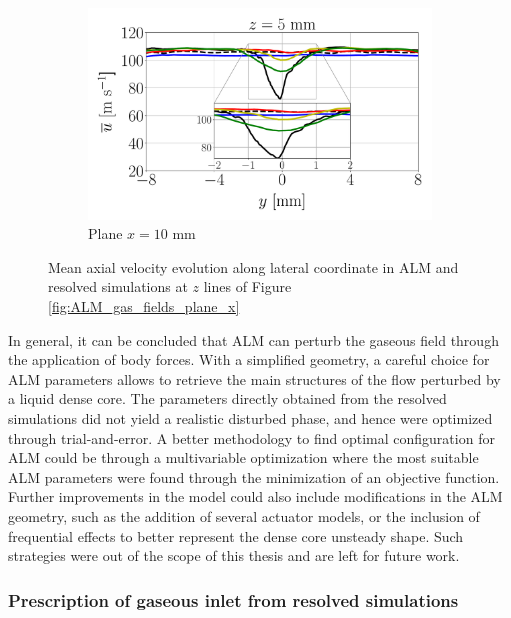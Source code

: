 \begin{figure}[ht]
\begin{subfigure}[b]{1.0\textwidth}
   \includegraphics[scale=0.24]{./part2_developments/figures_ch6_lagrangian_JICF/gas_field_initial_conditions/ALM_line_x10_z05p0_ux_mean_along_y}
   \vspace*{-0.1in}
	\caption{Plane $x = 10$ mm}
\end{subfigure}
   \caption{Mean axial velocity evolution along lateral coordinate in ALM and resolved simulations at $z$ lines of Figure \ref{fig:ALM_gas_fields_plane_x}}
\label{fig:JICF_ALM_lines_iso-x_along_y_ux_mean}
\end{figure}


In general, it can be concluded that ALM can perturb the gaseous field through the application of body forces. With a simplified geometry, a careful choice for ALM parameters allows to retrieve the main structures of the flow perturbed by a liquid dense core. The parameters directly obtained from the resolved simulations did not yield a realistic disturbed phase, and hence were optimized through trial-and-error. A better methodology to find optimal configuration for ALM could be through a multivariable optimization where the most suitable ALM parameters were found through the minimization of an objective function. Further improvements in the model could also include modifications in the ALM geometry, such as the addition of several actuator models, or the inclusion of frequential effects to better represent the dense core unsteady shape. Such strategies were out of the scope of this thesis and are left for future work. 


\clearpage

\subsubsection*{Prescription of gaseous inlet from resolved simulations }


